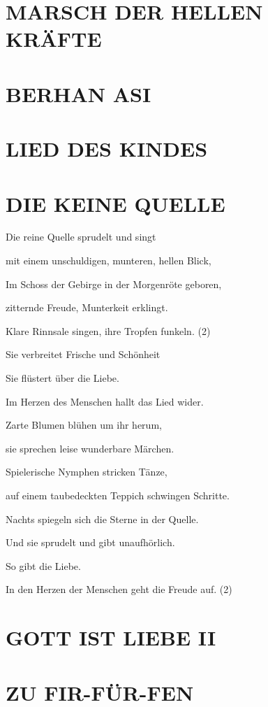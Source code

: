 \documentclass[11pt,a5paper,twoside]{article}
\begin{document}
\section[Marsch der hellen Kräfte]{MARSCH DER HELLEN KRÄFTE}

\section[Berhan Asi]{BERHAN ASI}

\section[Lied des Kindes]{LIED DES KINDES}

\section[Die kleine Quelle]{DIE KEINE QUELLE}

Die reine Quelle sprudelt und singt

mit einem unschuldigen, munteren, hellen Blick,

Im Schoss der Gebirge in der Morgenröte geboren,

zitternde Freude, Munterkeit erklingt. 

Klare Rinnsale singen, ihre Tropfen funkeln. (2) 

Sie verbreitet Frische und Schönheit

Sie flüstert über die Liebe. 

Im Herzen des Menschen hallt das Lied wider.

Zarte Blumen blühen um ihr herum,

sie sprechen leise wunderbare Märchen.

Spielerische Nymphen stricken Tänze,

auf einem taubedeckten Teppich schwingen Schritte. 

Nachts spiegeln sich die Sterne in der Quelle.

Und sie sprudelt und gibt unaufhörlich.

So gibt die Liebe. 

In den Herzen der Menschen geht die Freude auf. (2)

\section[Gott ist Liebe II]{GOTT IST LIEBE II}

\section[Zu Fir-für-Fen]{ZU FIR-FÜR-FEN}
\end{document}
